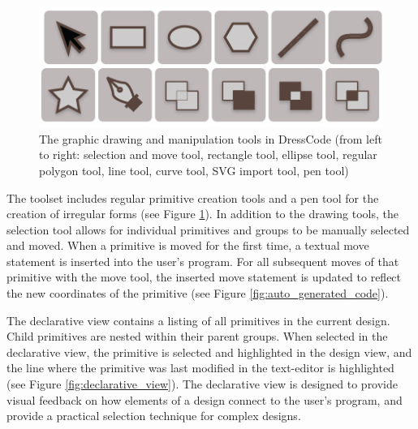 \documentclass{sigchi}
\begin{document}
\begin{center}
\begin{figure}[h!]
\includegraphics[width=0.75\columnwidth]{images/graphic_tools.jpg}
\caption{The graphic drawing and manipulation tools in DressCode (from left to right: selection and move tool, rectangle tool, ellipse tool, regular polygon tool, line tool, curve tool, SVG import tool, pen tool)}
\label{fig:graphic_tools}
\end{figure}
\end{center}
\vspace{-20pt}

The toolset includes regular primitive creation tools and a pen tool for the creation of irregular forms (see Figure \ref{fig:graphic_tools}).  In addition to the drawing tools, the selection tool allows for individual primitives and groups to be manually selected and moved. When a primitive is moved for the first time, a textual move statement is inserted into the user's program. For all subsequent moves of that primitive with the move tool, the inserted move statement is updated to reflect the new coordinates of the primitive (see Figure \ref{fig:auto_generated_code}).


The declarative view contains a listing of all primitives in the current design. Child primitives are nested within their parent groups. When selected in the declarative view, the primitive is selected and highlighted in the design view, and the line where the primitive was last modified in the text-editor is highlighted (see Figure \ref{fig:declarative_view}). The declarative view is designed to provide visual feedback on how elements of a design connect to the user's program, and provide a practical selection technique for complex designs.
\end{document}
